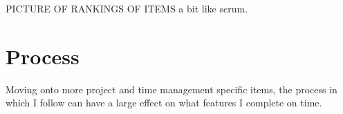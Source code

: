 PICTURE OF RANKINGS OF ITEMS a bit like scrum.

\section{Process}
Moving onto more project and time management specific items, the process in which I follow can have a large effect on what features I complete on time.

